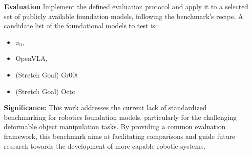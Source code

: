     \textbf{Evaluation}
        Implement the defined evaluation protocol and apply it to a selected set of publicly available foundation models, following the benchmark's recipe. A candidate list of the foundational models to test is:
        \begin{itemize}
            \item $\pi_0$, \cite{pi_zero}
            \item OpenVLA, \cite{OpenVLA}
            \item (Stretch Goal) Gr00t \cite{Gr00tN1}
            \item (Stretch Goal) Octo \cite{Octo}
        \end{itemize}
        


\textbf{Significance:} This work addresses the current lack of standardized benchmarking for robotics foundation models, particularly for the challenging deformable object manipulation tasks. By providing a common evaluation framework, this benchmark aims at facilitating comparisons and guide future research towards the development of more capable robotic systems.